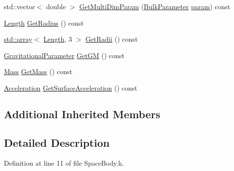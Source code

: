 \begin{DoxyCompactItemize}
\item 
std\+::vector$<$ double $>$ \hyperlink{class_space_body_a5a846abedc2aa8c89f4beabf186652fd}{Get\+Multi\+Dim\+Param} (\hyperlink{class_space_body_aac4475090a05b2f6d9c833f071c9bcac}{Bulk\+Parameter} \hyperlink{glext_8h_ac7c896d55e93a6cf7ff8524005b4e7b4}{param}) const 
\item 
\hyperlink{_quantity_8h_ae34580a93ad25d119ae1a64ded5aa3b2}{Length} \hyperlink{class_space_body_ada3282b18f50ad81c02d97a7b0095dee}{Get\+Radius} () const 
\item 
\hyperlink{glext_8h_a52f38e7d822a46377fde7a02708eedb1}{std\+::array}$<$ \hyperlink{_quantity_8h_ae34580a93ad25d119ae1a64ded5aa3b2}{Length}, 3 $>$ \hyperlink{class_space_body_a9040b548e16390c7294dcc4b2d5a5d58}{Get\+Radii} () const 
\item 
\hyperlink{_quantity_8h_a9a85e5d41c1ee35f67f3cc41ad01c417}{Gravitational\+Parameter} \hyperlink{class_space_body_aafaa2bca2b31f390a6c0094d3e36ff61}{Get\+G\+M} () const 
\item 
\hyperlink{_quantity_8h_a4ef88533f12b1ee67a3e0d8630b8ca87}{Mass} \hyperlink{class_space_body_ab5155fa5d6cc02f1dce20252187ff13d}{Get\+Mass} () const 
\item 
\hyperlink{_quantity_8h_aba4f456ecd43f9c8a095b7f882af47d8}{Acceleration} \hyperlink{class_space_body_a32dc9b481fe60576a78d4eab46be2d45}{Get\+Surface\+Acceleration} () const 
\end{DoxyCompactItemize}
\subsection*{Additional Inherited Members}


\subsection{Detailed Description}


Definition at line 11 of file Space\+Body.\+h.



